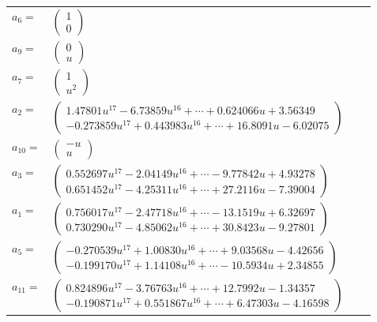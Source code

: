 \documentclass[1p]{elsarticle_modified}
\theoremstyle{definition}
\begin{document}
\begin{tabular}{m{7pt} m{180pt} m{7pt} m{180pt} }
\flushright $a_{6}=$&$\begin{pmatrix}1\\0\end{pmatrix}$ \\
\flushright $a_{9}=$&$\begin{pmatrix}0\\u\end{pmatrix}$ \\
\flushright $a_{7}=$&$\begin{pmatrix}1\\u^2\end{pmatrix}$ \\
\flushright $a_{2}=$&$\begin{pmatrix}1.47801 u^{17}-6.73859 u^{16}+\cdots+0.624066 u+3.56349\\-0.273859 u^{17}+0.443983 u^{16}+\cdots+16.8091 u-6.02075\end{pmatrix}$ \\
\flushright $a_{10}=$&$\begin{pmatrix}- u\\u\end{pmatrix}$ \\
\flushright $a_{3}=$&$\begin{pmatrix}0.552697 u^{17}-2.04149 u^{16}+\cdots-9.77842 u+4.93278\\0.651452 u^{17}-4.25311 u^{16}+\cdots+27.2116 u-7.39004\end{pmatrix}$ \\
\flushright $a_{1}=$&$\begin{pmatrix}0.756017 u^{17}-2.47718 u^{16}+\cdots-13.1519 u+6.32697\\0.730290 u^{17}-4.85062 u^{16}+\cdots+30.8423 u-9.27801\end{pmatrix}$ \\
\flushright $a_{5}=$&$\begin{pmatrix}-0.270539 u^{17}+1.00830 u^{16}+\cdots+9.03568 u-4.42656\\-0.199170 u^{17}+1.14108 u^{16}+\cdots-10.5934 u+2.34855\end{pmatrix}$ \\
\flushright $a_{11}=$&$\begin{pmatrix}0.824896 u^{17}-3.76763 u^{16}+\cdots+12.7992 u-1.34357\\-0.190871 u^{17}+0.551867 u^{16}+\cdots+6.47303 u-4.16598\end{pmatrix}$ \\

\end{tabular}
\end{document}
